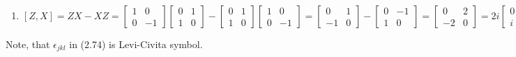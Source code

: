 \documentclass{article}
\begin{document}
\begin{framed}
\begin{enumerate}
        \item $[Z, X] = ZX - XZ = \begin{bmatrix}1 & 0 \\ 0 & -1\end{bmatrix}\begin{bmatrix}0 & 1 \\ 1 & 0 \end{bmatrix} - \begin{bmatrix}0 & 1 \\ 1 & 0 \end{bmatrix}\begin{bmatrix}1 & 0 \\ 0 & -1\end{bmatrix} = \begin{bmatrix}0 & 1 \\ -1 & 0\end{bmatrix} - \begin{bmatrix}0 & -1 \\ 1 & 0\end{bmatrix} = \begin{bmatrix}0 & 2 \\ -2 & 0\end{bmatrix} = 2i\begin{bmatrix}0 & -i \\ i & 0\end{bmatrix} = 2iY$
    \end{enumerate}
    Note, that $\epsilon_{jkl}$ in (2.74) is Levi-Civita symbol.
\end{framed}

\bigskip
\end{document}
